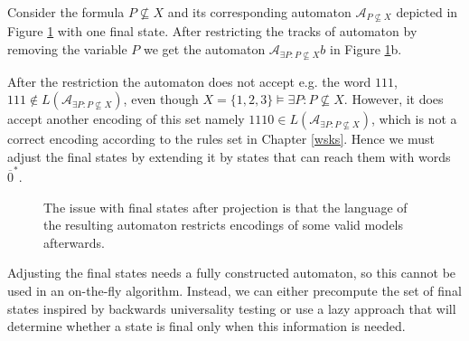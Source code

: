 \noindent\hrulefill
\begin{example}
 Consider the formula $P \not\subseteq X$ and its corresponding automaton
 $\mathcal{A}_{P \not\subseteq X}$ depicted in Figure \ref{projection} with
 one final state.
 After restricting the tracks of automaton by removing the variable $P$ we get
 the automaton $\mathcal{A}_{\exists P: P \not\subseteq X}b$ in Figure
 \ref{projection}b.
 
 After the restriction the automaton does not accept e.g. the word $111$, $111
 \notin L(\mathcal{A}_{\exists P: P \not\subseteq X})$, even though $X = \{1, 2,
 3\} \models \exists P: P \not\subseteq X$. However, it does accept another
 encoding of this set namely $1110 \in L(\mathcal{A}_{\exists P: P \not\subseteq
 X})$, which is not a correct encoding according to the rules set in Chapter
 \ref{wsks}. Hence we must adjust the final states by extending it by states
 that can reach them with words $\overline{0}^*$.
 
 \begin{figure}[h!]
  \begin{center}
  \end{center}
  \caption{The issue with final states after projection is that
  the language of the resulting automaton restricts encodings
  of some valid models afterwards.}\label{projection}
 \end{figure}\label{models}
\end{example}
\noindent\hrulefill

Adjusting the final states needs a fully constructed automaton, so this cannot
be used in an on-the-fly algorithm. Instead, we can either precompute the set of
final states inspired by backwards universality testing
\cite{backwards-universality} or use a lazy approach that will determine whether a state is final only when this
information is needed.

